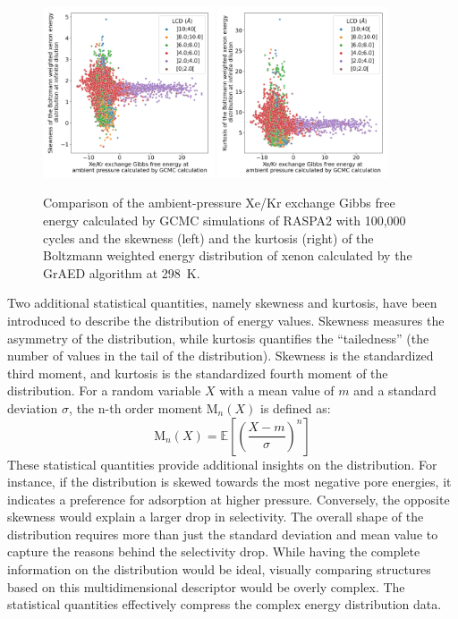 \documentclass[main]{subfiles}
\begin{document}
\begin{figure}[ht]
  \centering
    \includegraphics[width=0.45\textwidth]{figures/3-fastsim/G_2080_vs_enthalpy_skew_overview.jpg}
    \hfill
    \includegraphics[width=0.45\textwidth]{figures/3-fastsim/G_2080_vs_enthalpy_kurt_overview.jpg}
    \caption{Comparison of the ambient-pressure Xe/Kr exchange Gibbs free energy calculated by GCMC simulations of RASPA2 with 100,000 cycles and the skewness (left) and the kurtosis (right) of the Boltzmann weighted energy distribution of xenon calculated by the GrAED algorithm at \SI{298}{\kelvin}.}\label{fgr:enthalpy_skew_kurt}
\end{figure}

Two additional statistical quantities, namely skewness and kurtosis, have been introduced to describe the distribution of energy values. Skewness measures the asymmetry of the distribution, while kurtosis quantifies the ``tailedness'' (the number of values in the tail of the distribution). Skewness is the standardized third moment, and kurtosis is the standardized fourth moment of the distribution. For a random variable $X$ with a mean value of $m$ and a standard deviation $\sigma$, the n-th order moment $\text{M}_{n}(X)$ is defined as:
\begin{equation}
  \text{M}_n(X) = \mathbb{E}\left[{\left(\dfrac{X-m}{\sigma}\right)}^n\right]
\end{equation}
These statistical quantities provide additional insights on the distribution. For instance, if the distribution is skewed towards the most negative pore energies, it indicates a preference for adsorption at higher pressure. Conversely, the opposite skewness would explain a larger drop in selectivity. The overall shape of the distribution requires more than just the standard deviation and mean value to capture the reasons behind the selectivity drop. While having the complete information on the distribution would be ideal, visually comparing structures based on this multidimensional descriptor would be overly complex. The statistical quantities effectively compress the complex energy distribution data.
\end{document}

